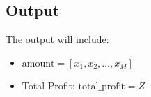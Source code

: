 \documentclass{article}
\begin{document}
\subsection*{Output}

The output will include:
\begin{itemize}
    \item \( \text{amount} = [x_{1}, x_{2}, \ldots, x_{M}] \)
    \item Total Profit: \( \text{total\_profit} = Z \)
\end{itemize}
\end{document}
